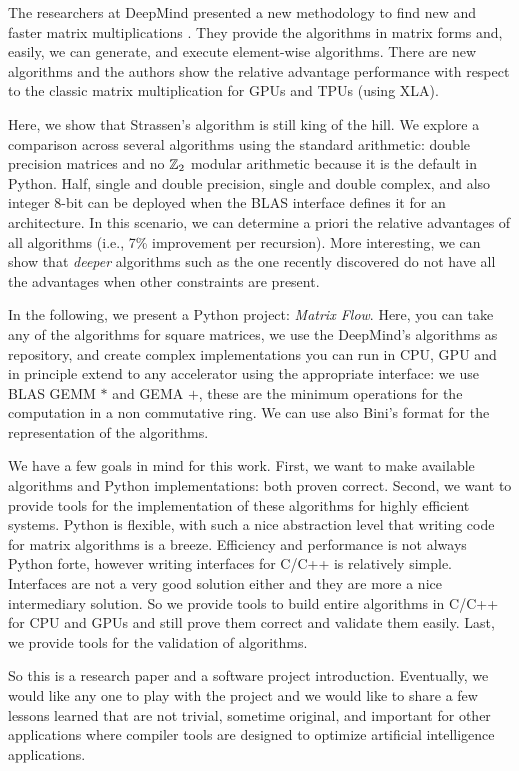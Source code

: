 \documentclass[acmsmall]{acmart}
\begin{document}
The researchers at DeepMind presented a new methodology to find new
and faster matrix multiplications \cite{PMID:36198780}. They provide
the algorithms in matrix forms and, easily, we can generate, and
execute element-wise algorithms.  There are new algorithms and the
authors show the relative advantage performance with respect to the
classic matrix multiplication for GPUs and TPUs (using XLA).

Here, we show that Strassen's algorithm \cite{STRASSEN1969} is still
king of the hill.  We explore a comparison across several algorithms
using the standard arithmetic: double precision matrices and no $\mathbb{Z}_2$
modular arithmetic because it is the default in Python. Half, single
and double precision, single and double complex, and also integer
8-bit can be deployed when the BLAS interface defines it for an
architecture. In this scenario, we can determine a priori the relative
advantages of all algorithms (i.e., 7\% improvement per
recursion). More interesting, we can show that {\em deeper} algorithms
such as the one recently discovered do not have all the advantages
when other constraints are present.

In the following, we present a Python project: {\em Matrix
  Flow}. Here, you can take any of the algorithms for square matrices,
we use the DeepMind's algorithms as repository, and create complex
implementations you can run in CPU, GPU and in principle extend to any
accelerator using the appropriate interface: we use BLAS GEMM $*$ and
GEMA $+$, these are the minimum operations for the computation in a
non commutative ring. We can use also Bini's format for the
representation of the algorithms.

We have a few goals in mind for this work. First, we want to make
available algorithms and Python implementations: both proven
correct. Second, we want to provide tools for the implementation of
these algorithms for highly efficient systems. Python is flexible,
with such a nice abstraction level that writing code for matrix
algorithms is a breeze. Efficiency and performance is not always
Python forte, however writing interfaces for C/C++ is relatively
simple. Interfaces are not a very good solution either and they are
more a nice intermediary solution. So we provide tools to build entire
algorithms in C/C++ for CPU and GPUs and still prove them correct and
validate them easily. Last, we provide tools for the validation of
algorithms.

So this is a research paper and a software project
introduction. Eventually, we would like any one to play with the
project and we would like to share a few lessons learned that are not
trivial, sometime original, and important for other applications where
compiler tools are designed to optimize artificial intelligence
applications.
\end{document}
